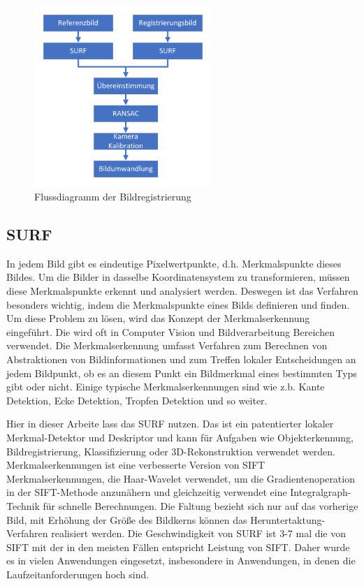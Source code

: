 \begin{figure}[H]
 \centering 
 \includegraphics[keepaspectratio,width=0.6\textwidth]{images/4_ZweiteErfahrung/Bildregistration.pdf}
 \caption{Flussdiagramm der Bildregistrierung}
 \label{fig:Bildregistrierung}
\end{figure}

\subsection{SURF}
In jedem Bild gibt es eindeutige Pixelwertpunkte, d.h. Merkmalspunkte dieses Bildes. Um die Bilder in dasselbe Koordinatensystem zu transformieren, müssen diese Merkmalspunkte erkennt und analysiert werden. Deswegen ist das Verfahren besonders wichtig, indem die Merkmalspunkte eines Bilds definieren und finden. Um diese Problem zu lösen, wird das Konzept der Merkmalserkennung eingeführt. Die wird oft in Computer Vision und Bildverarbeitung Bereichen verwendet. Die Merkmalserkennung umfasst Verfahren zum Berechnen von Abstraktionen von Bildinformationen und zum Treffen lokaler Entscheidungen an jedem Bildpunkt, ob es an diesem Punkt ein Bildmerkmal eines bestimmten Typs gibt oder nicht. Einige typische Merkmalserkennungen sind wie z.b. Kante Detektion, Ecke Detektion, Tropfen Detektion und so weiter.

Hier in dieser Arbeite lass das SURF \cite{Surf} nutzen. 
Das ist ein patentierter lokaler Merkmal-Detektor und Deskriptor und kann für Aufgaben wie Objekterkennung, Bildregistrierung, Klassifizierung oder 3D-Rekonstruktion verwendet werden. \cite{Surf} Merkmalserkennungen ist eine verbesserte Version von SIFT Merkmalserkennungen, die Haar-Wavelet verwendet, um die Gradientenoperation in der SIFT-Methode anzunähern und gleichzeitig verwendet eine Integralgraph-Technik für schnelle Berechnungen. Die Faltung bezieht sich nur auf das vorherige Bild, mit Erhöhung der Größe des Bildkerns können das Heruntertaktung-Verfahren realisiert werden. Die Geschwindigkeit von SURF ist 3-7 mal die von SIFT mit der in den meisten Fällen entspricht   Leistung von SIFT. Daher wurde es in vielen Anwendungen eingesetzt, insbesondere in Anwendungen, in denen die Laufzeitanforderungen hoch sind. 

